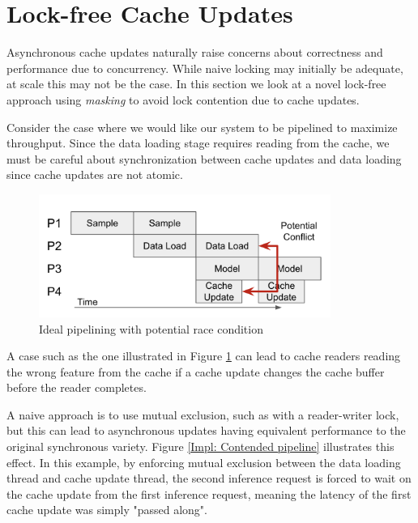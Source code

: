 \section{Lock-free Cache Updates} \label{Design: Lock-free}
Asynchronous cache updates naturally raise concerns about correctness and performance due to concurrency. While naive locking may initially be adequate, at scale this may not be the case. In this section we look at a novel lock-free approach using \textit{masking} to avoid lock contention due to cache updates.


Consider the case where we would like our system to be pipelined to maximize throughput. Since the data loading stage requires reading from the cache, we must be careful about synchronization between cache updates and data loading since cache updates are not atomic.
\begin{figure}[h!]
    \centering
    \includegraphics[width=0.85\textwidth]{figures/Pipeline no lock.png}
    \caption{Ideal pipelining with potential race condition}
    \label{Impl: Conflict pipeline}
\end{figure}     
A case such as the one illustrated in Figure \ref{Impl: Conflict pipeline} can lead to cache readers reading the wrong feature from the cache if a cache update changes the cache buffer before the reader completes. 

A naive approach is to use mutual exclusion, such as with a reader-writer lock, but this can lead to asynchronous updates having equivalent performance to the original synchronous variety. Figure \ref{Impl: Contended pipeline} illustrates this effect. In this example, by enforcing mutual exclusion between the data loading thread and cache update thread, the second inference request is forced to wait on the cache update from the first inference request, meaning the latency of the first cache update was simply "passed along".

